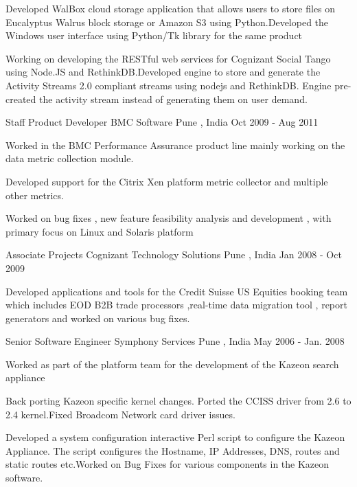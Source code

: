 \begin{cventries}
{\begin{cvitems}
        \item Developed WalBox cloud storage application that allows users to store files on Eucalyptus Walrus block storage or Amazon S3 using Python.Developed the Windows user interface using Python/Tk library for the same product
        \item Working on  developing the RESTful web services for Cognizant Social Tango using Node.JS and RethinkDB.Developed engine to store and generate the Activity Streams 2.0 compliant streams using nodejs and RethinkDB. Engine pre-created the activity stream instead of generating them on user demand.                
      \end{cvitems}
    }

  \cventry
    {Staff Product Developer}
    {BMC Software}
    {Pune , India}
    {Oct 2009 - Aug 2011}        
    {
        \begin{cvitems}
          \item Worked  in the BMC Performance Assurance product line mainly working on the data metric collection module.
          \item Developed support for the Citrix Xen platform metric collector and multiple other metrics.
          \item Worked  on bug fixes , new feature feasibility analysis and development , with primary focus on Linux and Solaris platform
        \end{cvitems}
    }

  \cventry
    {Associate Projects}
    {Cognizant Technology Solutions}
    {Pune , India}
    {Jan 2008 - Oct 2009}    
    {
        \begin{cvitems}
          \item Developed applications and tools for the Credit Suisse US Equities booking team which includes EOD B2B trade processors ,real-time data migration tool , report generators and worked on various bug fixes.
        \end{cvitems}
    }

  \cventry
    {Senior Software Engineer}
    {Symphony Services}
    {Pune , India}
    {May 2006 - Jan. 2008}    
    {
      \begin{cvitems}
        \item Worked as part of the platform team for the development of the Kazeon search appliance
        \item Back porting Kazeon specific kernel changes. Ported the CCISS driver from 2.6 to 2.4 kernel.Fixed Broadcom Network card driver issues. 
        \item Developed a  system configuration interactive Perl script to configure the Kazeon Appliance. The script configures the Hostname, IP Addresses, DNS, routes and static routes etc.Worked on Bug Fixes for various components in the Kazeon software.
      \end{cvitems}
    }


\end{cventries}
